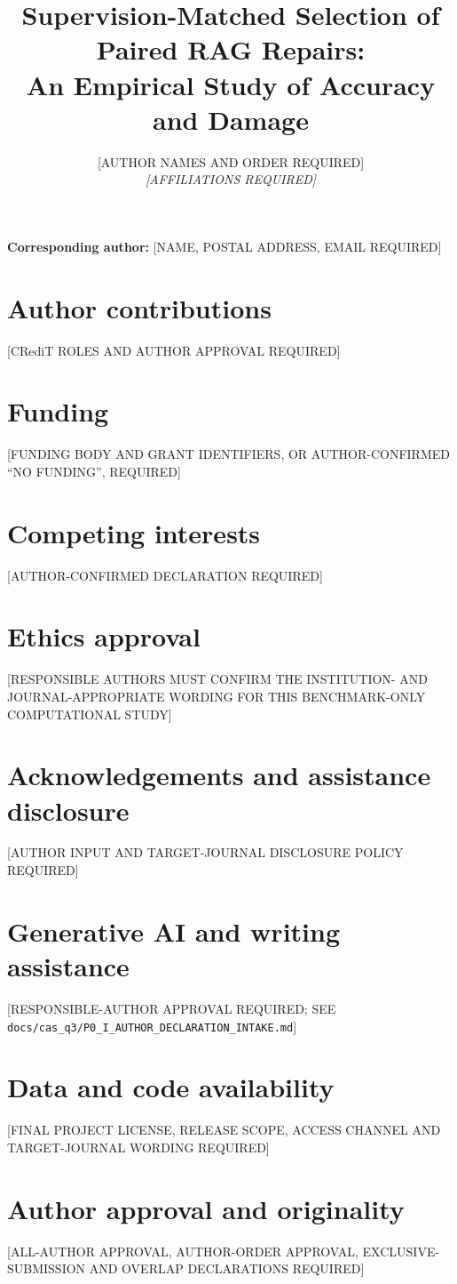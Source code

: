 \documentclass[11pt]{article}
\title{Supervision-Matched Selection of Paired RAG Repairs:\\An Empirical Study of Accuracy and Damage}
\author{[AUTHOR NAMES AND ORDER REQUIRED]\\[0.5em]\textit{[AFFILIATIONS REQUIRED]}}
\date{}
\begin{document}
\maketitle
\noindent\textbf{Corresponding author:} [NAME, POSTAL ADDRESS, EMAIL REQUIRED]

\section*{Author contributions}
[CRediT ROLES AND AUTHOR APPROVAL REQUIRED]

\section*{Funding}
[FUNDING BODY AND GRANT IDENTIFIERS, OR AUTHOR-CONFIRMED ``NO FUNDING'', REQUIRED]

\section*{Competing interests}
[AUTHOR-CONFIRMED DECLARATION REQUIRED]

\section*{Ethics approval}
[RESPONSIBLE AUTHORS MUST CONFIRM THE INSTITUTION- AND JOURNAL-APPROPRIATE WORDING FOR THIS BENCHMARK-ONLY COMPUTATIONAL STUDY]

\section*{Acknowledgements and assistance disclosure}
[AUTHOR INPUT AND TARGET-JOURNAL DISCLOSURE POLICY REQUIRED]

\section*{Generative AI and writing assistance}
[RESPONSIBLE-AUTHOR APPROVAL REQUIRED; SEE
\texttt{docs/cas\_q3/P0\_I\_AUTHOR\_DECLARATION\_INTAKE.md}]

\section*{Data and code availability}
[FINAL PROJECT LICENSE, RELEASE SCOPE, ACCESS CHANNEL AND TARGET-JOURNAL WORDING
REQUIRED]

\section*{Author approval and originality}
[ALL-AUTHOR APPROVAL, AUTHOR-ORDER APPROVAL, EXCLUSIVE-SUBMISSION AND OVERLAP
DECLARATIONS REQUIRED]
\end{document}

